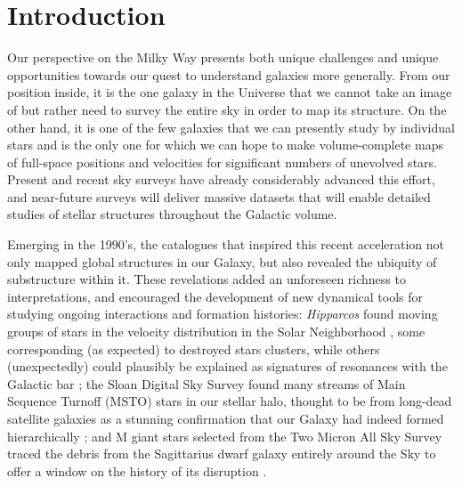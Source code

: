 \documentclass[galaxies,article,submit,moreauthors,pdftex,10pt,a4paper]{mdpi}
\newcommand{\project}[1]{\textsl{#1}}
\begin{document}


\section{Introduction}

Our perspective on the Milky Way presents both unique challenges and unique opportunities towards our quest to understand galaxies more generally.
From our position inside, it is the one galaxy in the Universe that we cannot take an image of but rather need to survey the entire sky in order to map its structure.
On the other hand, it is one of the few galaxies that we can presently study by individual stars and is the only one for which we can hope to make volume-complete maps of full-space positions and velocities for significant numbers of unevolved stars.
Present and recent sky surveys have already considerably advanced this effort, and near-future surveys will deliver massive datasets that will enable detailed studies of stellar structures throughout the Galactic volume.


Emerging in the 1990's, the catalogues that inspired this recent acceleration not only mapped global structures in our Galaxy, but also revealed the ubiquity of substructure within it.
These revelations added an unforeseen richness to interpretations, and encouraged the development of new dynamical tools for studying ongoing interactions and formation histories:
\project{Hipparcos} \citep{esa97} found moving groups of stars in the velocity distribution in the Solar Neighborhood \citep{dehnen98}, some corresponding (as expected) to destroyed stars clusters, while others (unexpectedly) could plausibly be explained as signatures of resonances with the Galactic bar \citep{dehnen00};
the Sloan Digital Sky Survey \citep[hereafter, SDSS ---][]{york00,stoughton02,abazajian03} found many streams of Main Sequence Turnoff (MSTO) stars in our stellar halo, thought to be from long-dead satellite galaxies \citep{newberg02,belokurov06} as a stunning confirmation that our Galaxy had indeed formed hierarchically \citep[e.g.][]{bullock01,bullock05};
and M giant stars selected from the Two Micron All Sky Survey \citep[hereafter, 2MASS ---][]{nikolaev00} traced the debris from the Sagittarius dwarf galaxy entirely around the Sky \citep{majewski03} to offer a window on the history of its disruption \citep{law10}.
\end{document}
